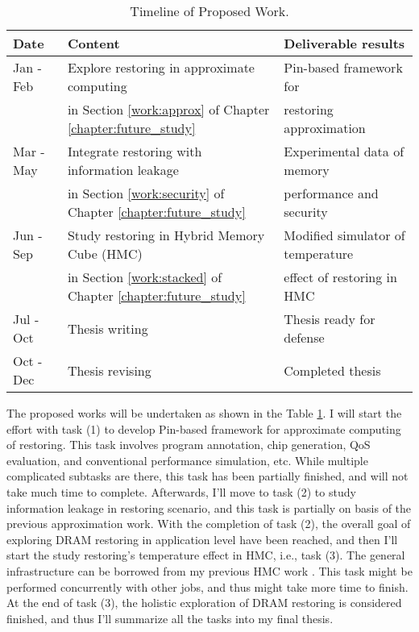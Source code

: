 \begin{table}[ht]
\vspace{-0.3in}
\caption{Timeline of Proposed Work.}
\vspace{-0.15in}
\centering
\scalebox{0.85}
{
\begin{tabular}{|l|l|l|}
\hline
\textbf{Date} & \textbf{Content} & \textbf{Deliverable results} \\
\hline
Jan - Feb  & Explore restoring in approximate computing & Pin-based framework for \\
 & in Section \ref{work:approx} of Chapter \ref{chapter:future_study}& restoring approximation \\
\hline
Mar - May  & Integrate restoring with information leakage & Experimental data of memory\\%
 & in Section \ref{work:security} of Chapter \ref{chapter:future_study}& performance and security\\
\hline
Jun - Sep & Study restoring in Hybrid Memory Cube (HMC) & Modified simulator of temperature\\
 & in Section \ref{work:stacked} of Chapter \ref{chapter:future_study}&  effect of restoring in HMC \\
\hline
Jul - Oct  & Thesis writing & Thesis ready for defense \\
\hline
Oct - Dec & Thesis revising & Completed thesis \\
\hline
\end{tabular}
}
\label{tab:timeline}
\end{table}

The proposed works will be undertaken as shown in the Table \ref{tab:timeline}.
I will start the effort with task (1) to develop Pin-based framework for approximate computing of restoring. This task involves program annotation, chip generation, QoS evaluation, and conventional performance simulation, etc.
While multiple complicated subtasks are there, this task has been partially finished, and will not take much time to complete.
Afterwards, I'll move to task (2) to study information leakage in restoring scenario, and this task is partially on basis of the previous approximation work.
With the completion of task (2), the overall goal of exploring DRAM restoring in application level have been reached, and then I'll start the study restoring's temperature effect in HMC, i.e., task (3).
The general infrastructure can be borrowed from my previous HMC work \cite{ICCD15:dlb}. This task might be performed concurrently with other jobs, and thus might take more time to finish.
At the end of task (3), the holistic exploration of DRAM restoring is considered finished, and thus I'll summarize all the tasks into my final thesis.